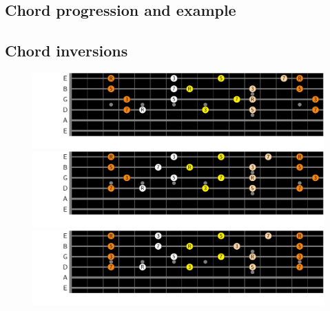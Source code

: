 \documentclass{article}
\begin{document}
\newpage
\subsection{Chord progression and example}



\newpage
\subsection{Chord inversions}

\begin{figure}[h!]
	\centering
	\hspace*{-2.2cm}
	\includegraphics[scale=0.7, trim= {0cm 0cm 0cm 0cm}, clip]{figures/chord-inversions/maj7.pdf}
	\hspace*{-2.2cm}
	\includegraphics[scale=0.7, trim= {0cm 0cm 0cm 0cm}, clip]{figures/chord-inversions/Dominant7.pdf}
	\hspace*{-2.2cm}
	\includegraphics[scale=0.7, trim= {0cm 0cm 0cm 0cm}, clip]{figures/chord-inversions/m7.pdf}
	\caption{ }
	\label{fig}
\end{figure}

\end{document}
